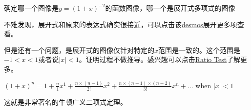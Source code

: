 \begin{TaskBox}
确定哪一个图像是$y=(1+x)^{-2}$的函数图像，哪一个是展开式多项式的图像
\end{TaskBox}

不难发现，展开式和原来的表达式确实很接近，可以点击该\href{https://www.desmos.com/calculator/huhb3kfnjz}{desmos}展开更多项查看。

但是还有一个问题，是展开式的图像仅针对特定的$x$范围是一致的。这个范围是$-1<x<1$或者说$|x|<1$。证明过程不做推导。感兴趣可以点击\href{https://tutorial.math.lamar.edu/classes/calcii/RatioTest.aspx}{Ratio Test}了解更多。

\begin{SummBox}
$(1+x)^n=1+\frac{n}{1}x^1+\frac{n\times(n-1)}{2!}x^2+\frac{n\times(n-1)\times(n-2)}{3!}x^n+\ldots$        when $|x|<1$
\end{SummBox}

这就是非常著名的牛顿广义二项式定理。
